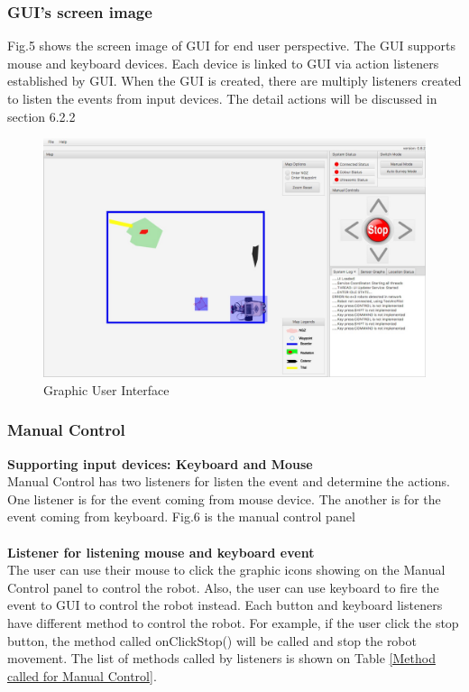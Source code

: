 \subsubsection{GUI's screen image}
Fig.5 shows the screen image of GUI for end user perspective. The GUI supports mouse and keyboard devices. Each device is linked to GUI via action listeners established by GUI. When the GUI is created, there are multiply listeners created to listen the events from input devices. The detail actions will be discussed in section 6.2.2  

\begin{figure}[H]
	\includegraphics[width=\linewidth]{GUI.png}  %
	\caption{Graphic User Interface}
	\label{fig:Graphic User Interface}              
\end{figure}

\subsubsection{Manual Control}
\textbf{Supporting input devices: Keyboard and Mouse}\\
Manual Control has two listeners for listen the event and determine the actions. One listener is for the event coming from mouse device. The another is for the event coming from keyboard. Fig.6 is the manual control panel \\
\\
\textbf{Listener for listening mouse and keyboard event}\\
The user can use their mouse to click the graphic icons showing on the Manual Control panel to control the robot. Also, the user can use keyboard to fire the event to GUI to control the robot instead. Each button and keyboard listeners have different method to control the robot. For example, if the user click the stop button, the method called onClickStop() will be called and stop the robot movement. The list of methods called by listeners is shown on Table \ref{Method called for Manual Control}.

